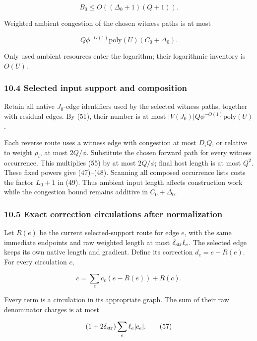 \[
B_0\leq O((\Delta_0+1)(Q+1)).
\]

Weighted ambient congestion of the chosen witness paths is at most

\[
Q\phi^{-O(1)}\mathrm{poly}(U)(C_0+\Delta_0).
 \tag{55}
\]

Only used ambient resources enter the logarithm; their logarithmic inventory is \(O(U)\).

\hypertarget{af-46593eb93e-selected-input-support-and-composition}{%
\subsubsection{10.4 Selected input support and composition}\label{af-46593eb93e-selected-input-support-and-composition}}

Retain all native \(J_0\)-edge identifiers used by the selected witness paths, together with residual edges. By (51), their number is at most \(|V(J_0)|Q\phi^{-O(1)}\mathrm{poly}(U)\).

Each reverse route uses a witness edge with congestion at most \(D_iQ\), or relative to weight \(\rho_i\), at most \(2Q/\phi\). Substitute the chosen forward path for every witness occurrence. This multiplies (55) by at most \(2Q/\phi\); final host length is at most \(Q^2\). These fixed powers give (47)--(48). Scanning all composed occurrence lists costs the factor \(L_0+1\) in (49). Thus ambient input length affects construction work while the congestion bound remains additive in \(C_0+\Delta_0\).

\hypertarget{af-46593eb93e-exact-correction-circulations-after-normalization}{%
\subsubsection{10.5 Exact correction circulations after normalization}\label{af-46593eb93e-exact-correction-circulations-after-normalization}}

Let \(R(e)\) be the current selected-support route for edge \(e\), with the same immediate endpoints and raw weighted length at most \(\delta_{\rm str}\ell_e\). The selected edge keeps its own native length and gradient. Define its correction \(d_e=e-R(e)\). For every circulation \(c\),

\[
c=\sum_e c_e(e-R(e))+R(c).
 \tag{56}
\]

Every term is a circulation in its appropriate graph. The sum of their raw denominator charges is at most

\[
(1+2\delta_{\rm str})\sum_e\ell_e|c_e|.
 \tag{57}
\]

